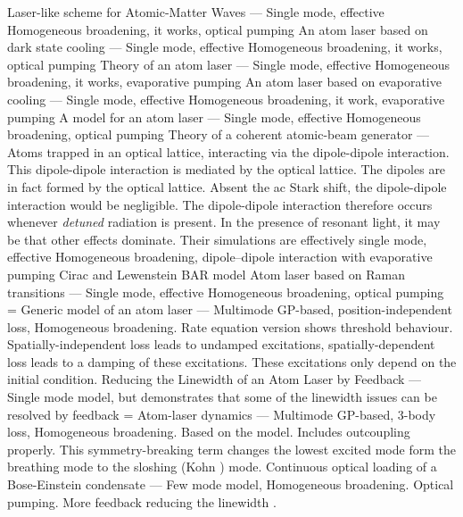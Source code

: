 Laser-like scheme for Atomic-Matter Waves \citep{Spreeuw:1995} --- Single mode, effective Homogeneous broadening, it works, optical pumping
An atom laser based on dark state cooling \citep{Wiseman:1995} --- Single mode, effective Homogeneous broadening, it works, optical pumping
Theory of an atom laser \citep{Holland:1996mz} --- Single mode, effective Homogeneous broadening, it works, evaporative pumping
An atom laser based on evaporative cooling \citep{Wiseman:1996} --- Single mode, effective Homogeneous broadening, it work, evaporative pumping
A model for an atom laser \citep{Olshanii:1996} --- Single mode, effective Homogeneous broadening, optical pumping
Theory of a coherent atomic-beam generator \citep{Guzman:1996} ---  Atoms trapped in an optical lattice, interacting via the dipole-dipole interaction.  This dipole-dipole interaction is mediated by the optical lattice.  The dipoles are in fact formed by the optical lattice.  Absent the ac Stark shift, the dipole-dipole interaction would be negligible.  The dipole-dipole interaction therefore occurs whenever \emph{detuned} radiation is present.  In the presence of resonant light, it may be that other effects dominate.  Their simulations are effectively single mode, effective Homogeneous broadening, dipole--dipole interaction with evaporative pumping
Cirac and Lewenstein BAR model \citep{Cirac:1996rr}
Atom laser based on Raman transitions \citep{Moy:1997} --- Single mode, effective Homogeneous broadening, optical pumping
= Generic model of an atom laser \citep{Kneer:1998fk} --- Multimode GP-based, position-independent loss, Homogeneous broadening.  Rate equation version shows threshold behaviour.  Spatially-independent loss leads to undamped excitations, spatially-dependent loss leads to a damping of these excitations.  These excitations only depend on the initial condition.
Reducing the Linewidth of an Atom Laser by Feedback \citep{Wiseman:2001zr} --- Single mode model, but demonstrates that some of the linewidth issues can be resolved by feedback
= Atom-laser dynamics \citep{Robins:2001pd} --- Multimode GP-based, 3-body loss, Homogeneous broadening.  Based on the \citep{Kneer:1998fk} model.  Includes outcoupling properly.  This symmetry-breaking term changes the lowest excited mode form the breathing mode to the sloshing (Kohn \citep{Dalfovo:1999ly}) mode. 
Continuous optical loading of a Bose-Einstein condensate \citep{Santos:2001ve} --- Few mode model, Homogeneous broadening.  Optical pumping.
More feedback reducing the linewidth \citep{Thomsen:2002xc}.
